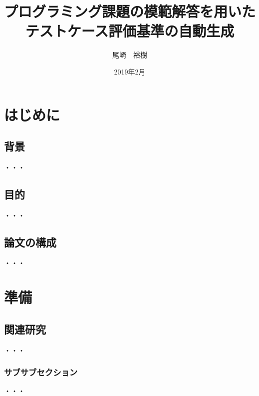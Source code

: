 \documentclass[11pt,a4j]{jsreport}
\title{プログラミング課題の模範解答を用いた\\テストケース評価基準の自動生成}
\author{尾崎　裕樹}
\date{2019年2月}
\begin{document}
 
\maketitle

 
\setcounter{tocdepth}{2}
\tableofcontents
\clearpage

\chapter{はじめに}
\section{背景}
  ・・・
\section{目的}
  ・・・
\section{論文の構成}
  ・・・
\chapter{準備}
\section{関連研究}
  ・・・
\subsection{サブサブセクション}
  ・・・
\end{document}
